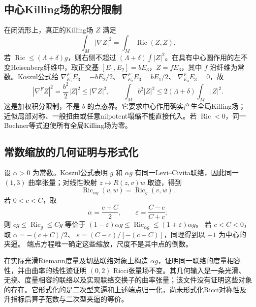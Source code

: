 \documentclass[UTF8,a4paper,11pt,fontset=fandol]{ctexart}
\numberwithin{equation}{section}
\theoremstyle{definition}
\newcommand{\Ric}{\operatorname{Ric}}
\begin{document}
\subsection{中心Killing场的积分限制}
在闭流形上，真正的Killing场 $Z$ 满足
\[
\int_M|\nabla Z|^2=\int_M\Ric(Z,Z).
\]
若 $\Ric\le(\Lambda+\delta)g$，则右侧不超过
$(\Lambda+\delta)\int|Z|^2$。在具有中心圆作用的左不变Heisenberg纤维中，取正交基
$[E_1,E_2]=bE_3$，$Z=fE_3$，其中 $f$ 沿纤维为常数。Koszul公式给
$\nabla^F_{E_1}E_3=-bE_2/2$、
$\nabla^F_{E_2}E_3=bE_1/2$、
$\nabla^F_{E_3}E_3=0$，故
\[
|\nabla^FZ|^2=\frac{b^2}{2}|Z|^2
\le|\nabla Z|^2,\qquad
\int_Mb^2|Z|^2\le2(\Lambda+\delta)\int_M|Z|^2.
\]
这是加权积分限制，不是 $b$ 的点态界。它要求中心作用确实产生全局Killing场；近似局部对称、一般扭曲或任意nilpotent塌缩不能直接代入。若 $\Ric<0$，同一Bochner等式迫使所有全局Killing场为零。

\subsection{常数缩放的几何证明与形式化}
设 $\alpha>0$ 为常数。Koszul公式表明 $g$ 和 $\alpha g$ 有同一Levi--Civita联络，因此同一 $(1,3)$ 曲率张量；对线性映射
$z\mapsto R(z,v)w$ 取迹，得到
\[
\Ric_{\alpha g}(v,w)=\Ric_g(v,w).
\]
若 $0<c<C$，取
\[
\alpha=\frac{c+C}{2},\qquad \varepsilon=\frac{C-c}{C+c};
\]
则 $cg\le\Ric_g\le Cg$ 等价于
$(1-\varepsilon)\alpha g\le\Ric_{\alpha g}\le(1+\varepsilon)\alpha g$。
若 $c<C<0$，取
$\alpha=-(c+C)/2$、
$\varepsilon=(C-c)/[-(c+C)]$，同理得到以 $-1$ 为中心的夹逼。
端点方程唯一确定这些缩放，尺度不是其中点的倒数。

在实际光滑Riemann度量及切丛联络对象上构造 $\alpha g$，证明同一联络的度量相容性，并由曲率的线性迹证明 $(0,2)$ Ricci张量场不变。其几何输入是一条光滑、无挠、度量相容的联络以及实现联络交换子的曲率张量；该文件没有证明这些对象的存在。它形式化的是二次型夹逼和上述端点归一化，尚未形式化Ricci对称性及升指标后算子范数与二次型夹逼的等价。
\end{document}
